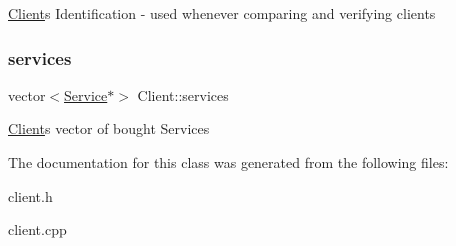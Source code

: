 \hyperlink{class_client}{Client}\textquotesingle{}s Identification -\/ used whenever comparing and verifying clients \mbox{\label{class_client_a02b601f12b9905edae7e64ded9bde912}} 
\subsubsection{\texorpdfstring{services}{services}}
{\footnotesize\ttfamily vector$<$\hyperlink{class_service}{Service}$\ast$$>$ Client\+::services\hspace{0.3cm}{\ttfamily [protected]}}

\hyperlink{class_client}{Client}\textquotesingle{}s vector of bought Services 

The documentation for this class was generated from the following files\+:\begin{DoxyCompactItemize}
\item 
client.\+h\item 
client.\+cpp\end{DoxyCompactItemize}
